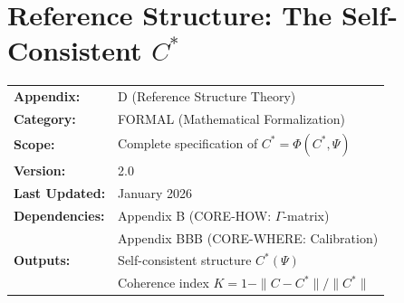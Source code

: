 %
%
%
%
%

\section{Reference Structure: The Self-Consistent $C^*$}
\label{app:formal-cstar}



\begin{tcolorbox}[colback=blue!5!white, colframe=blue!75!black,
    title=\textbf{Appendix D: FORMAL-CSTAR}]

\begin{tabular}{@{}ll@{}}
\textbf{Appendix:} & D (Reference Structure Theory) \\
\textbf{Category:} & FORMAL (Mathematical Formalization) \\
\textbf{Scope:} & Complete specification of $C^* = \Phi(C^*, \Psi)$ \\
\textbf{Version:} & 2.0 \\
\textbf{Last Updated:} & January 2026 \\
\textbf{Dependencies:} & Appendix B (CORE-HOW: $\Gamma$-matrix) \\
                       & Appendix BBB (CORE-WHERE: Calibration) \\
\textbf{Outputs:} & Self-consistent structure $C^*(\Psi)$ \\
                  & Coherence index $K = 1 - \|C - C^*\|/\|C^*\|$ \\
\end{tabular}

\end{tcolorbox}

